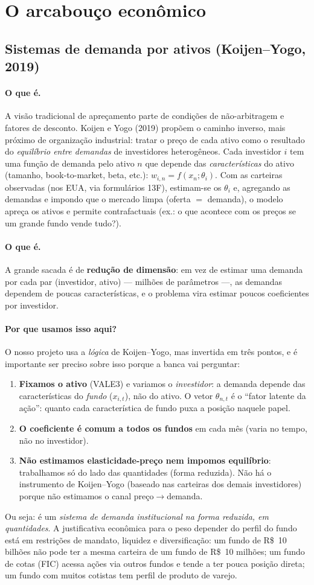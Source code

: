 \documentclass[11pt,a4paper]{article}
\newcommand{\porque}[0]{\paragraph{Por que usamos isso aqui?}}
\newcommand{\oquee}[0]{\paragraph{O que é.}}
\begin{document}
\section{O arcabouço econômico}
\label{sec:eco}

\subsection{Sistemas de demanda por ativos (Koijen--Yogo, 2019)}

\oquee A visão tradicional de apreçamento parte de condições de não-arbitragem e fatores de
desconto. Koijen e Yogo (2019) propõem o caminho inverso, mais próximo de organização industrial:
tratar o preço de cada ativo como o resultado do \emph{equilíbrio entre demandas} de investidores
heterogêneos. Cada investidor $i$ tem uma função de demanda pelo ativo $n$ que depende das
\emph{características} do ativo (tamanho, book-to-market, beta, etc.): $w_{i,n} =
f(x_n;\theta_i)$. Com as carteiras observadas (nos EUA, via formulários 13F), estimam-se os
$\theta_i$ e, agregando as demandas e impondo que o mercado limpa (oferta $=$ demanda), o modelo
apreça os ativos e permite contrafactuais (ex.: o que acontece com os preços se um grande fundo
vende tudo?).

\oquee A grande sacada é de \textbf{redução de dimensão}: em vez de estimar uma demanda por
cada par (investidor, ativo) --- milhões de parâmetros ---, as demandas dependem de poucas
características, e o problema vira estimar poucos coeficientes por investidor.

\porque O nosso projeto usa a \emph{lógica} de Koijen--Yogo, mas invertida em três pontos, e é
importante ser preciso sobre isso porque a banca vai perguntar:
\begin{enumerate}[topsep=2pt,itemsep=1pt]
\item \textbf{Fixamos o ativo} (VALE3) e variamos o \emph{investidor}: a demanda depende das
características do \emph{fundo} ($x_{i,t}$), não do ativo. O vetor $\theta_{n,t}$ é o ``fator
latente da ação'': quanto cada característica de fundo puxa a posição naquele papel.
\item \textbf{O coeficiente é comum a todos os fundos} em cada mês (varia no tempo, não no
investidor).
\item \textbf{Não estimamos elasticidade-preço nem impomos equilíbrio}: trabalhamos só do lado
das quantidades (forma reduzida). Não há o instrumento de Koijen--Yogo (baseado nas carteiras dos
demais investidores) porque não estimamos o canal preço$\to$demanda.
\end{enumerate}
Ou seja: é um \emph{sistema de demanda institucional na forma reduzida, em quantidades}. A
justificativa econômica para o peso depender do perfil do fundo está em restrições de mandato,
liquidez e diversificação: um fundo de R\$~10 bilhões não pode ter a mesma carteira de um fundo de
R\$~10 milhões; um fundo de cotas (FIC) acessa ações via outros fundos e tende a ter pouca posição
direta; um fundo com muitos cotistas tem perfil de produto de varejo.
\end{document}
